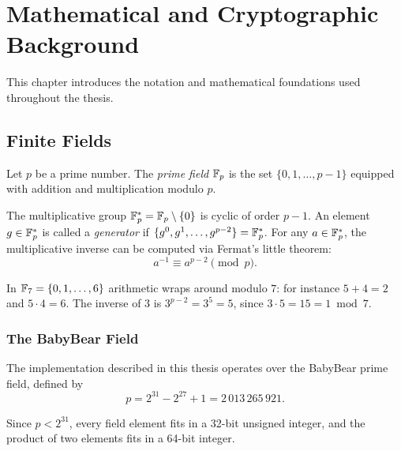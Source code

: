 \chapter{Mathematical and Cryptographic Background}
\label{ch:background}

This chapter introduces the notation and mathematical foundations
used throughout the thesis.


\section{Finite Fields}
\label{sec:finite_fields}

\begin{definition}
\label{def:prime_field}
Let $p$ be a prime number. The \emph{prime field} $\mathbb{F}_p$ is the set
$\{0, 1, \ldots, p-1\}$ equipped with addition and multiplication
modulo $p$.
\end{definition}

The multiplicative group $\mathbb{F}_p^* = \mathbb{F}_p \setminus \{0\}$ is cyclic of
order $p - 1$. An element $g \in \mathbb{F}_p^*$ is called a \emph{generator}
if $\{g^0, g^1, \ldots, g^{p-2}\} = \mathbb{F}_p^*$. For any $a \in \mathbb{F}_p^*$,
the multiplicative inverse can be computed via Fermat's little theorem:
%
\begin{equation}
\label{eq:fermat}
a^{-1} \equiv a^{p-2} \pmod{p}.
\end{equation}

\begin{example}
\label{ex:prime_field}
In $\mathbb{F}_7 = \{0,1,\ldots,6\}$ arithmetic wraps around modulo $7$: for
instance $5 + 4 = 2$ and $5 \cdot 4 = 6$. The inverse of $3$ is
$3^{p-2} = 3^{5} = 5$, since $3 \cdot 5 = 15 = 1 \bmod 7$.
\end{example}


\subsection{The BabyBear Field}
\label{subsec:babybear}

The implementation described in this thesis operates over the BabyBear
prime field, defined by
%
\begin{equation}
\label{eq:babybear_prime}
p = 2^{31} - 2^{27} + 1 = 2\,013\,265\,921.
\end{equation}

Since $p < 2^{31}$, every field element fits in a 32-bit unsigned
integer, and the product of two elements fits in a 64-bit integer.

